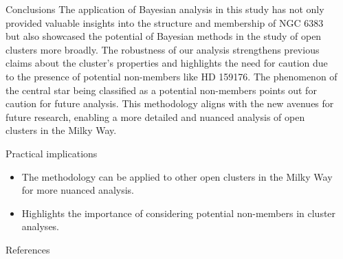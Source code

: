 \documentclass[final]{beamer}
\newlength{\sepwidth}
\newlength{\colwidth}
\newcommand{\separatorcolumn}{\begin{column}{\sepwidth}\end{column}}
\begin{document}
\begin{frame}[t]
\begin{columns}[t]
\begin{column}{\colwidth}
   \begin{block}{Conclusions}
   	The application of Bayesian analysis in this study has not only provided valuable insights into the structure and membership of NGC 6383 but also showcased the potential of Bayesian methods in the study of open clusters more broadly. The robustness of our analysis strengthens previous claims about the cluster's properties and highlights the need for caution due to the presence of potential non-members like HD 159176. The phenomenon of the central star being classified as a potential non-members points out for caution for future analysis. This methodology aligns with the new avenues for future research, enabling a more detailed and nuanced analysis of open clusters in the Milky Way.

  \end{block}


  \begin{exampleblock}{Practical implications}
    \begin{itemize}
	\item The methodology can be applied to other open clusters in the Milky Way for more nuanced analysis.
	\item Highlights the importance of considering potential non-members in cluster analyses.
    \end{itemize}

  \end{exampleblock}


  \begin{block}{References}
   \footnotesize{}

  \end{block}
\end{column}
\separatorcolumn
\end{columns}
\end{frame}
\end{document}
